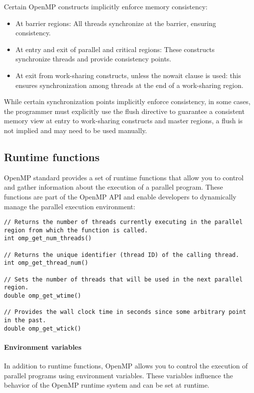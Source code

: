 Certain OpenMP constructs implicitly enforce memory consistency:
\begin{itemize}
    \item At barrier regions: All threads synchronize at the barrier, ensuring consistency.
    \item At entry and exit of parallel and critical regions: These constructs synchronize threads and provide consistency points.
    \item At exit from work-sharing constructs, unless the nowait clause is used: this ensures synchronization among threads at the end of a work-sharing region.
\end{itemize}
While certain synchronization points implicitly enforce consistency, in some cases, the programmer must explicitly use the flush directive to guarantee a consistent memory view at entry to work-sharing constructs and master regions, a flush is not implied and may need to be used manually.

\subsection{Runtime functions}
OpenMP standard provides a set of runtime functions that allow you to control and gather information about the execution of a parallel program. 
These functions are part of the OpenMP API and enable developers to dynamically manage the parallel execution environment: 
\begin{lstlisting}[style=C]
// Returns the number of threads currently executing in the parallel region from which the function is called.
int omp_get_num_threads()

// Returns the unique identifier (thread ID) of the calling thread.
int omp_get_thread_num()

// Sets the number of threads that will be used in the next parallel region.
double omp_get_wtime()

// Provides the wall clock time in seconds since some arbitrary point in the past.
double omp_get_wtick()
\end{lstlisting}

\paragraph*{Environment variables}
In addition to runtime functions, OpenMP allows you to control the execution of parallel programs using environment variables. 
These variables influence the behavior of the OpenMP runtime system and can be set at runtime.

